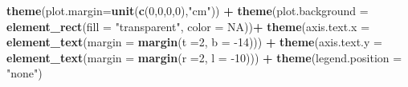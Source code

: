 \documentclass[12pt,twoside]{reedthesis}
\newenvironment{Shaded}{\begin{snugshade}}{\end{snugshade}}
\newcommand{\DataTypeTok}[1]{\textcolor[rgb]{0.13,0.29,0.53}{#1}}
\newcommand{\DecValTok}[1]{\textcolor[rgb]{0.00,0.00,0.81}{#1}}
\newcommand{\KeywordTok}[1]{\textcolor[rgb]{0.13,0.29,0.53}{\textbf{#1}}}
\newcommand{\NormalTok}[1]{#1}
\newcommand{\OperatorTok}[1]{\textcolor[rgb]{0.81,0.36,0.00}{\textbf{#1}}}
\newcommand{\OtherTok}[1]{\textcolor[rgb]{0.56,0.35,0.01}{#1}}
\newcommand{\StringTok}[1]{\textcolor[rgb]{0.31,0.60,0.02}{#1}}
\begin{document}
\begin{Shaded}
\begin{Highlighting}[]
\StringTok{  }\KeywordTok{theme}\NormalTok{(}\DataTypeTok{plot.margin=}\KeywordTok{unit}\NormalTok{(}\KeywordTok{c}\NormalTok{(}\DecValTok{0}\NormalTok{,}\DecValTok{0}\NormalTok{,}\DecValTok{0}\NormalTok{,}\DecValTok{0}\NormalTok{),}\StringTok{"cm"}\NormalTok{)) }\OperatorTok{+}
\StringTok{  }\KeywordTok{theme}\NormalTok{(}\DataTypeTok{plot.background =} \KeywordTok{element_rect}\NormalTok{(}\DataTypeTok{fill =} \StringTok{"transparent"}\NormalTok{, }\DataTypeTok{color =} \OtherTok{NA}\NormalTok{))}\OperatorTok{+}
\StringTok{  }\KeywordTok{theme}\NormalTok{(}\DataTypeTok{axis.text.x =} \KeywordTok{element_text}\NormalTok{(}\DataTypeTok{margin =}  \KeywordTok{margin}\NormalTok{(}\DataTypeTok{t =}\DecValTok{2}\NormalTok{, }\DataTypeTok{b =} \DecValTok{-14}\NormalTok{))) }\OperatorTok{+}\StringTok{ }
\StringTok{  }\KeywordTok{theme}\NormalTok{(}\DataTypeTok{axis.text.y =} \KeywordTok{element_text}\NormalTok{(}\DataTypeTok{margin =}  \KeywordTok{margin}\NormalTok{(}\DataTypeTok{r =}\DecValTok{2}\NormalTok{, }\DataTypeTok{l =} \DecValTok{-10}\NormalTok{))) }\OperatorTok{+}
\StringTok{  }\KeywordTok{theme}\NormalTok{(}\DataTypeTok{legend.position =} \StringTok{"none"}\NormalTok{)}


\end{Highlighting}
\end{Shaded}
\end{document}
